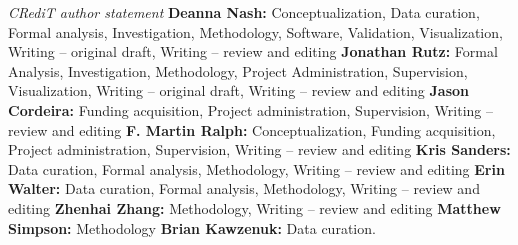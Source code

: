 \documentclass[draft]{agujournal2019}
\begin{document}


\textit{CRediT author statement} \textbf{Deanna Nash:} Conceptualization, Data curation, Formal analysis, Investigation, Methodology, Software, Validation, Visualization, Writing – original draft, Writing – review and editing \textbf{Jonathan Rutz:} Formal Analysis, Investigation, Methodology, Project Administration, Supervision, Visualization, Writing – original draft, Writing – review and editing \textbf{Jason Cordeira:} Funding acquisition, Project administration, Supervision, Writing – review and editing \textbf{F. Martin Ralph:} Conceptualization, Funding acquisition, Project administration, Supervision, Writing – review and editing \textbf{Kris Sanders:} Data curation, Formal analysis, Methodology, Writing – review and editing \textbf{Erin Walter:} Data curation, Formal analysis, Methodology, Writing – review and editing \textbf{Zhenhai Zhang:} Methodology, Writing – review and editing \textbf{Matthew Simpson:} Methodology \textbf{Brian Kawzenuk:} Data curation.



%
%





%
%
%
%
%
\end{document}
